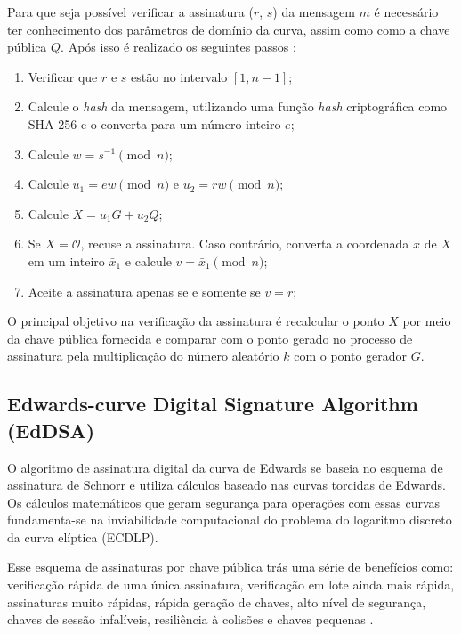 Para que seja possível verificar a assinatura ($r$, $s$) da mensagem $m$ é necessário ter conhecimento dos parâmetros de domínio da curva, assim como como a chave pública $Q$. Após isso é realizado os seguintes passos \cite{johnson2001elliptic}:
\begin{enumerate}
    \item Verificar que $r$ e $s$ estão no intervalo $[1, n - 1]$;
    \item Calcule o \textit{hash} da mensagem, utilizando uma função \textit{hash} criptográfica como SHA-256 e o converta para um número inteiro $e$;
    \item Calcule $w = s^{-1} \pmod{n}$;
    \item Calcule $u_1 = ew \pmod{n}$ e $u_2 = rw \pmod{n}$;
    \item Calcule $X = u_1 G + u_2 Q$;
    \item Se $X = \mathcal{O}$, recuse a assinatura. Caso contrário, converta a coordenada $x$ de $X$ em um inteiro $\bar x_1$ e calcule $v = \bar x_1 \pmod{n}$;
    \item Aceite a assinatura apenas se e somente se $v = r$;
\end{enumerate}

O principal objetivo na verificação da assinatura é recalcular o ponto $X$ por meio da chave pública fornecida e comparar com o ponto gerado no processo de assinatura pela multiplicação do número aleatório $k$ com o ponto gerador $G$.  

\subsection{Edwards-curve Digital Signature Algorithm (EdDSA)}

O algoritmo de assinatura digital da curva de Edwards se baseia no esquema de assinatura de Schnorr e utiliza cálculos baseado nas curvas torcidas de Edwards. Os cálculos matemáticos que geram segurança para operações com essas curvas fundamenta-se na inviabilidade computacional do problema do logaritmo discreto da curva elíptica (ECDLP).

Esse esquema de assinaturas por chave pública trás uma série de benefícios como: verificação rápida de uma única assinatura, verificação em lote ainda mais rápida, assinaturas muito rápidas, rápida geração de chaves, alto nível de segurança, chaves de sessão infalíveis, resiliência à colisões e chaves pequenas \cite{bernstein2012high}.

